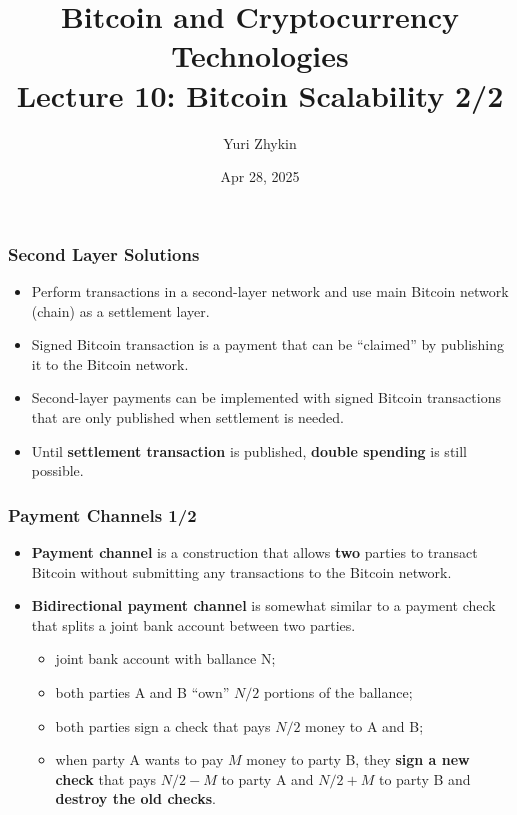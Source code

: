 \documentclass{beamer}
\title{
  Bitcoin and Cryptocurrency Technologies \\
  Lecture 10: Bitcoin Scalability 2/2
}
\author{Yuri Zhykin}
\date{Apr 28, 2025}
\begin{document}
\frame{\titlepage}

\begin{frame}
  \frametitle{Second Layer Solutions}
  \begin{itemize}
  \item Perform transactions in a second-layer network and use main Bitcoin
    network (chain) as a settlement layer.
  \item Signed Bitcoin transaction is a payment that can be ``claimed'' by
    publishing it to the Bitcoin network.
  \item Second-layer payments can be implemented with signed Bitcoin
    transactions that are only published when settlement is needed.
  \item Until \textbf{settlement transaction} is published, \textbf{double
      spending} is still possible.
  \end{itemize}
\end{frame}

\begin{frame}
  \frametitle{Payment Channels 1/2}
  \begin{itemize}
  \item \textbf{Payment channel} is a construction that allows \textbf{two}
    parties to transact Bitcoin without submitting any transactions to the
    Bitcoin network.
  \item \textbf{Bidirectional payment channel} is somewhat similar to a payment
    check that splits a joint bank account between two parties.
    \begin{itemize}
    \item joint bank account with ballance N;
    \item both parties A and B ``own'' $N/2$ portions of the ballance;
    \item both parties sign a check that pays $N/2$ money to A and B;
    \item when party A wants to pay $M$ money to party B, they \textbf{sign a
        new check} that pays $N/2 - M$ to party A and $N/2 + M$ to party B and
      \textbf{destroy the old checks}.
    \end{itemize}
  \end{itemize}
\end{frame}
\end{document}

